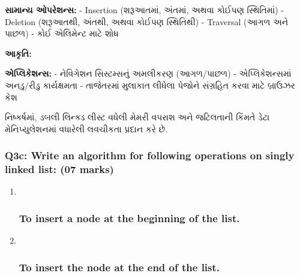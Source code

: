 \textbf{સામાન્ય ઓપરેશન્સ:} - Insertion (શરૂઆતમાં, અંતમાં, અથવા કોઈપણ સ્થિતિમાં) -
Deletion (શરૂઆતથી, અંતથી, અથવા કોઈપણ સ્થિતિથી) - Traversal (આગળ અને પાછળ) -
કોઈ એલિમેન્ટ માટે શોધ

\textbf{આકૃતિ:}

\begin{Shaded}
\begin{Highlighting}[]
\end{Highlighting}
\end{Shaded}

\textbf{એપ્લિકેશન્સ:} - નેવિગેશન સિસ્ટમ્સનું અમલીકરણ (આગળ/પાછળ) - એપ્લિકેશન્સમાં
અનડુ/રીડુ કાર્યક્ષમતા - તાજેતરમાં મુલાકાત લીધેલા પેજોને સંગ્રહિત કરવા માટે બ્રાઉઝર કેશ

નિષ્કર્ષમાં, ડબલી લિન્ક્ડ લીસ્ટ વધેલી મેમરી વપરાશ અને જટિલતાની કિંમતે ડેટા
મેનિપ્યુલેશનમાં વધારેલી લવચીકતા પ્રદાન કરે છે.

\hypertarget{q3c-write-an-algorithm-for-following-operations-on-singly-linked-list-07-marks}{%
\subsubsection{Q3c: Write an algorithm for following operations on
singly linked list: (07
marks)}\label{q3c-write-an-algorithm-for-following-operations-on-singly-linked-list-07-marks}}

\begin{enumerate}
\def\labelenumi{\arabic{enumi}.}
\item ~
  \hypertarget{to-insert-a-node-at-the-beginning-of-the-list.}{%
  \subsubsection{To insert a node at the beginning of the
  list.}\label{to-insert-a-node-at-the-beginning-of-the-list.}}
\item ~
  \hypertarget{to-insert-the-node-at-the-end-of-the-list.}{%
  \subsubsection{To insert the node at the end of the
  list.}\label{to-insert-the-node-at-the-end-of-the-list.}}
\end{enumerate}

